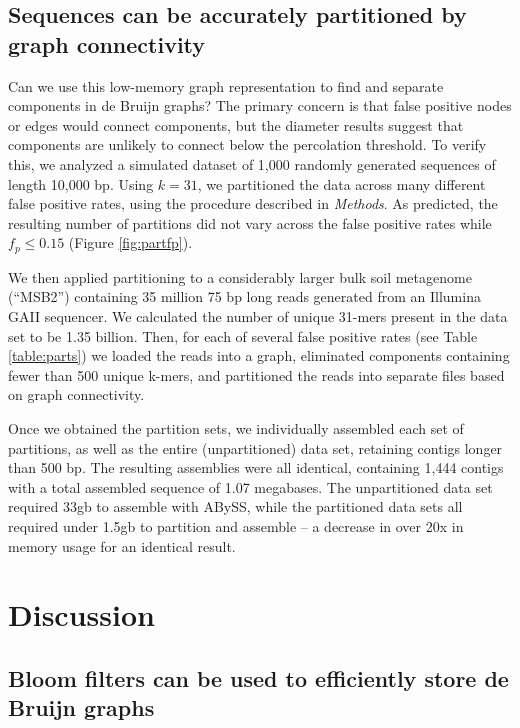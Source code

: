 \documentclass{pnastwo}
\begin{document}
\begin{article}
\subsection{Sequences can be accurately partitioned by graph connectivity}


Can we use this low-memory graph representation to find and separate
components in de Bruijn graphs?  The primary concern is that false positive
nodes or edges would connect components, but the diameter results suggest that
components are unlikely to connect below the percolation
threshold. To verify this, we analyzed a simulated dataset of 1,000
randomly generated sequences of length 10,000 bp.  Using $k=31$,
we partitioned the data across many different false positive rates,
using the procedure described in \emph{Methods}. As predicted, the
resulting number of partitions did not vary across the false positive
rates while $f_p \le 0.15$ (Figure \ref{fig:partfp}).

We then applied partitioning to a considerably larger bulk soil
metagenome (``MSB2'') containing 35 million 75 bp long reads generated
from an Illumina GAII sequencer.  We calculated the number of unique
31-mers present in the data set to be 1.35 billion. Then, for each of
several false positive rates (see Table \ref{table:parts}) we loaded
the reads into a graph, eliminated components containing fewer than
500 unique k-mers, and partitioned the reads into separate files based
on graph connectivity.

Once we obtained the partition sets, we individually assembled each
set of partitions, as well as the entire (unpartitioned) data set,
retaining contigs longer than 500 bp.  The resulting assemblies were
all identical, containing 1,444 contigs with a total assembled
sequence of 1.07 megabases.  The unpartitioned data set required 33gb to
assemble with ABySS, while the partitioned data sets all required
under 1.5gb to partition and assemble -- a decrease in over 20x
in memory usage for an identical result.


\section{Discussion}


\subsection{Bloom filters can be used to efficiently store de Bruijn graphs}


\end{article}
\end{document}

